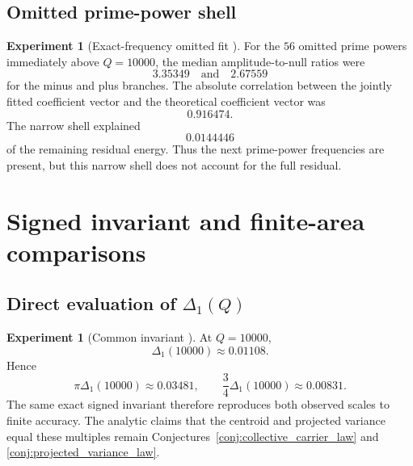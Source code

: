 \documentclass[11pt]{amsart}
\numberwithin{equation}{section}
\theoremstyle{plain}
\theoremstyle{definition}
\newtheorem{experiment}[theorem]{Experiment}
\theoremstyle{remark}
\newcommand{\1}{\mathbf{1}}
\begin{document}
\subsection{Omitted prime-power shell}
\label{subsec:numerical_omitted_shell}

\begin{experiment}[Exact-frequency omitted fit {\normalfont[Numerical]}]
\label{exp:numerical_omitted_fit_detailed}
For the $56$ omitted prime powers immediately above $Q=10000$, the median
amplitude-to-null ratios were
\begin{equation}
3.35349
\quad\text{and}\quad
2.67559
\label{eq:numerical_omitted_ratios_detailed}
\end{equation}
for the minus and plus branches.  The absolute correlation between the
jointly fitted coefficient vector and the theoretical coefficient vector was
\begin{equation}
0.916474.
\label{eq:numerical_omitted_correlation_detailed}
\end{equation}
The narrow shell explained
\begin{equation}
0.0144446
\label{eq:numerical_omitted_energy_fraction_detailed}
\end{equation}
of the remaining residual energy.  Thus the next prime-power frequencies
are present, but this narrow shell does not account for the full residual.
\end{experiment}

\section{Signed invariant and finite-area comparisons}
\label{sec:numerical_signed_invariant}

\subsection{Direct evaluation of \texorpdfstring{\(\Delta_1(Q)\)}{Delta1(Q)}}
\label{subsec:numerical_Delta_evaluation}

\begin{experiment}[Common invariant {\normalfont[Numerical]}]
\label{exp:numerical_common_invariant}
At $Q=10000$,
\begin{equation}
\Delta_1(10000)\approx0.01108.
\label{eq:numerical_Delta_detailed}
\end{equation}
Hence
\begin{equation}
\pi\Delta_1(10000)\approx0.03481,
\qquad
\frac34\Delta_1(10000)\approx0.00831.
\label{eq:numerical_Delta_multiples_detailed}
\end{equation}
The same exact signed invariant therefore reproduces both observed scales
to finite accuracy.  The analytic claims that the centroid and projected
variance equal these multiples remain Conjectures~\ref{conj:collective_carrier_law}
and \ref{conj:projected_variance_law}.
\end{experiment}
\end{document}
